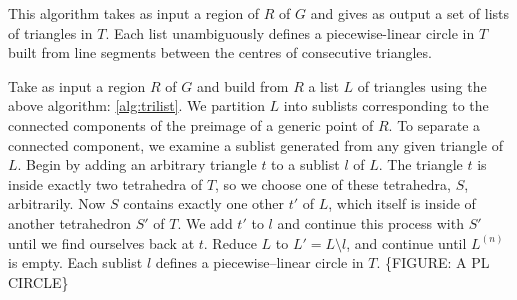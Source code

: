 \label{alg:circlist}
This algorithm takes as input a region of $R$ of $G$ and gives as output a set of lists of triangles in $T$.
Each list unambiguously defines a piecewise-linear circle in $T$ built from line segments between the centres of consecutive triangles.

Take as input a region $R$ of $G$ and build from $R$ a list $L$ of triangles using the above algorithm: \ref{alg:trilist}.
We partition $L$ into sublists corresponding to the connected components of the preimage of a generic point of $R$.
To separate a connected component, we examine a sublist generated from any given triangle of $L$.
Begin by adding an arbitrary triangle $t$ to a sublist $l$ of $L$.
The triangle $t$ is inside exactly two tetrahedra of $T$, so we choose one of these tetrahedra, $S$, arbitrarily.
Now $S$ contains exactly one other $t'$ of $L$, which itself is inside of another tetrahedron $S'$ of $T$.
We add $t'$ to $l$ and continue this process with $S'$ until we find ourselves back at $t$.
Reduce $L$ to $L'=L\setminus l$, and continue until $L^{(n)}$ is empty.
Each sublist $l$ defines a piecewise--linear circle in $T$.
\{FIGURE: A PL CIRCLE\}
